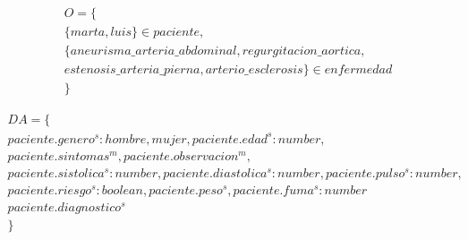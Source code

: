 \documentclass[10pt, a4paper,spanish]{article}
\begin{document}
			\begin{multline*}
				O = \{ \\
					\{marta, luis\} \in paciente, \\
					\{aneurisma\_arteria\_abdominal, regurgitacion\_aortica, \\
					estenosis\_arteria\_pierna, arterio\_esclerosis \} \in enfermedad \\
				\}
			\end{multline*}

			\begin{multline*}
				DA = \{ \\
					paciente.genero^s:{hombre, mujer}, paciente.edad^s:number, \\
					paciente.sintomas^m, paciente.observacion^m, \\
					paciente.sistolica^s:number, paciente.diastolica^s:number, paciente.pulso^s:number, \\
					paciente.riesgo^s:boolean, paciente.peso^s, paciente.fuma^s:number \\
					paciente.diagnostico^s \\
				\}
			\end{multline*}
\end{document}
